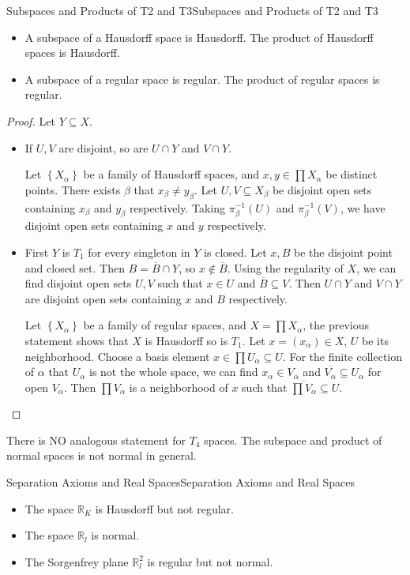 \documentclass[../main.tex]{subfiles}
\begin{document}
\begin{theorem}{Subspaces and Products of T2 and T3}{Subspaces and Products of T2 and T3}
\begin{itemize}
\item A subspace of a Hausdorff space is Hausdorff. The product of Hausdorff spaces is Hausdorff.
\item A subspace of a regular space is regular. The product of regular spaces is regular.
\end{itemize}
\end{theorem}
\begin{proof}
	Let $Y \subseteq X$.
\begin{itemize}
\item If $U,V$ are disjoint, so are $U\cap Y$ and $V\cap Y$.

	Let $\left\{ X_{\alpha} \right\}$ be a family of Hausdorff spaces, and $x,y\in \prod X_{\alpha}$ be distinct points. There exists $\beta$ that $x_{\beta}\neq y_{\beta}$. Let $U,V \subseteq X_{\beta}$ be disjoint open sets containing $x_{\beta}$ and $y_{\beta}$ respectively. Taking $\pi_{\beta}^{-1}(U)$ and $\pi_{\beta}^{-1}(V)$, we have disjoint open sets containing $x$ and $y$ respectively.
\item First $Y$ is $T_1$ for every singleton in $Y$ is closed. Let $x,B$ be the disjoint point and closed set. Then $B = \overline{B}\cap Y$, so $x\notin \overline{B}$. Using the regularity of $X$, we can find disjoint open sets $U,V$ such that $x\in U$ and $\overline{B} \subseteq V$. Then $U\cap Y$ and $V\cap Y$ are disjoint open sets containing $x$ and $B$ respectively.

	Let $\left\{ X_{\alpha} \right\}$ be a family of regular spaces, and $X = \prod X_{\alpha}$, the previous statement shows that $X$ is Hausdorff so is $T_1$. Let $x = (x_{\alpha})\in X$, $U$ be its neighborhood. Choose a basis element $x\in \prod U_{\alpha} \subseteq U$. For the finite collection of $\alpha$ that $U_{\alpha}$ is not the whole space, we can find $x_{\alpha}\in V_{\alpha}$ and $\overline{V_{\alpha}}\subseteq U_{\alpha}$ for open $V_{\alpha}$. 
	Then $\prod V_{\alpha}$ is a neighborhood of $x$ such that $\overline{\prod V_{\alpha}} \subseteq U$.
\end{itemize}
\end{proof}

There is NO analogous statement for $T_4$ spaces. The subspace and product of normal spaces is not normal in general.

\begin{example}{Separation Axioms and Real Spaces}{Separation Axioms and Real Spaces}
\begin{itemize}
\item The space $\mathbb{R}_K$ is Hausdorff but not regular.
\item The space $\mathbb{R}_l$ is normal.
\item The Sorgenfrey plane $\mathbb{R}_l^2$ is regular but not normal.
\end{itemize}
\end{example}
\end{document}
